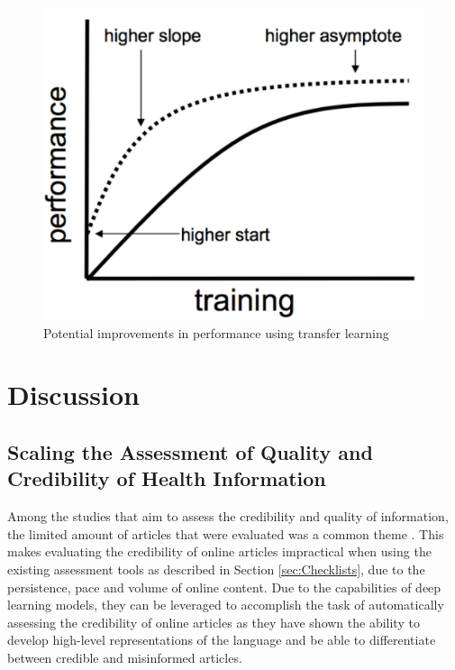 \documentclass[a4paper,twoside,phd]{BYUPhys}
\begin{document}
\begin{figure}[H]
	\centering
	\includegraphics[totalheight=7cm]{images/transfer-learning.png}
	\caption{Potential improvements in performance using transfer learning \cite{Browniee2017}}
	\label{fig:TransferLearning}
\end{figure}

\section{Discussion}
\label{sec:LitReviewDiscussion}

\subsection{Scaling the Assessment of Quality and Credibility of Health Information}
\label{sec:ScalingAssessment}

Among the studies that aim to assess the credibility and quality of information, the limited amount of articles that were evaluated was a common theme \cite{Batchelor2009} \cite{CanteyBanasiak2017} \cite{Cipriani} \cite{Kaicker2010} \cite{Som2012}. This makes evaluating the credibility of online articles impractical when using the existing assessment tools as described in Section \ref{sec:Checklists}, due to the persistence, pace and volume of online content. Due to the capabilities of deep learning models, they can be leveraged to accomplish the task of automatically assessing the credibility of online articles as they have shown the ability to develop high-level representations of the language and be able to differentiate between credible and misinformed articles.
\end{document}
